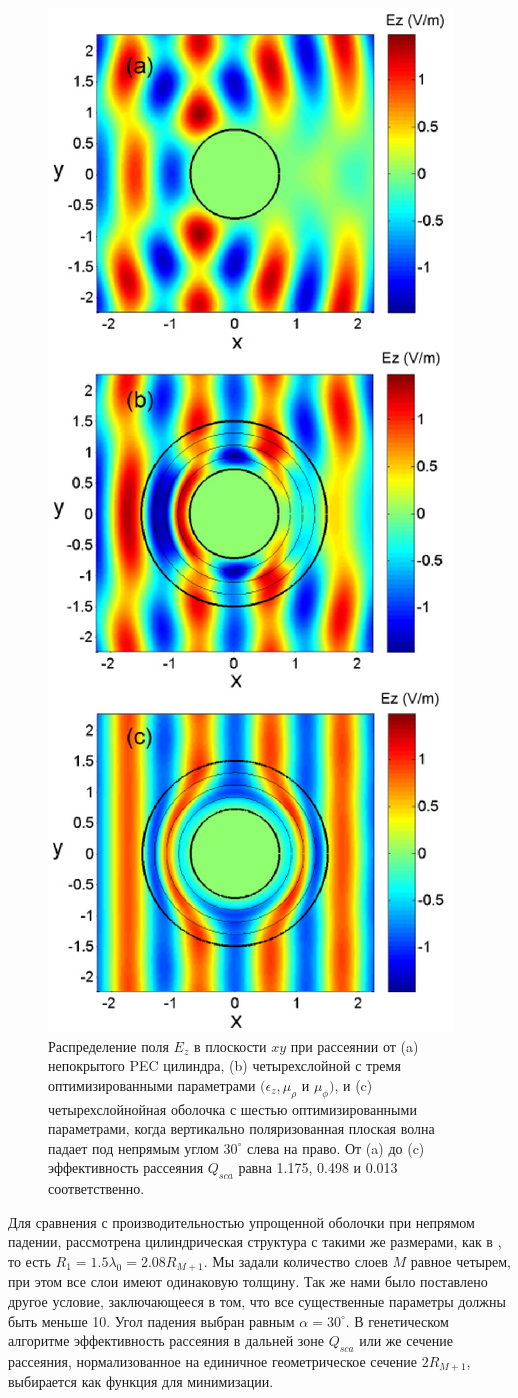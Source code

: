\documentclass[a4paper, 12pt]{article}
\begin{document}
\begin{figure}
  \centering
  \includegraphics[width=0.5\columnwidth,draft=false]{Fig_2}
  \caption{
  Распределение поля $E_z$ в плоскости $xy$ при рассеянии от (a) непокрытого
  PEC цилиндра, (b) четырехслойной с тремя оптимизированными параметрами 
  $(\epsilon_z, \mu_\rho$ и $\mu_\phi)$, и (c) четырехслойнойная оболочка
  с шестью оптимизированными параметрами, когда вертикально поляризованная плоская волна падает под непрямым углом $30^{\circ}$ слева на право.
  От (a) до (c) эффективность рассеяния $Q_{sca}$ равна 
  1.175, 0.498 и 0.013 соответственно. }
  \label{fig:field}
\end{figure}

Для сравнения с производительностью упрощенной оболочки при непрямом падении,
рассмотрена цилиндрическая структура с такими же размерами, как в \cite{14},
то есть $R_1 = 1.5\lambda_0=2.08R_{M+1}$. Мы задали количество слоев $M$ 
равное четырем, при этом все слои имеют одинаковую толщину. Так же нами было
поставлено другое условие, заключающееся в том, что все существенные параметры
должны быть меньше 10. Угол падения выбран равным $\alpha = 30^\circ$.
В генетическом алгоритме эффективность рассеяния в дальней зоне $Q_{sca}$ 
\cite{7} или же сечение рассеяния, нормализованное на единичное геометрическое 
сечение $2R_{M+1}$, выбирается как функция для минимизации.
\end{document}
